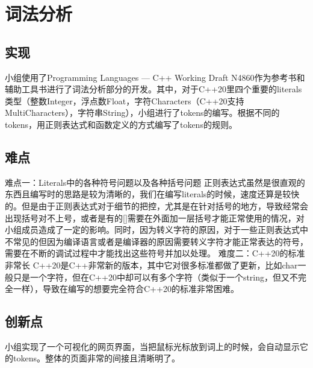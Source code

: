 \section{词法分析}

\subsection{实现}

小组使用了Programming Languages — C++ Working Draft N4860作为参考书和辅助工具书进行了词法分析部分的开发。其中，对于C++20里四个重要的literals类型（整数Integer，浮点数Float，字符Characters（C++20支持MultiCharacters），字符串String），小组进行了tokens的编写。根据不同的tokens，用正则表达式和函数定义的方式编写了tokens的规则。

\subsection{难点}

难点一：Literals中的各种符号问题以及各种括号问题
正则表达式虽然是很直观的东西且编写时的思路是较为清晰的，我们在编写literals的时候，速度还算是较快的。但是由于正则表达式对于细节的把控，尤其是在针对括号的地方，导致经常会出现括号对不上号，或者是有的[]需要在外面加一层括号才能正常使用的情况，对小组成员造成了一定的影响。同时，因为转义字符的原因，对于一些正则表达式中不常见的但因为编译语言或者是编译器的原因需要转义字符才能正常表达的符号，需要在不断的调试过程中才能找出这些符号并加以处理。
	难度二：C++20的标准非常长
C++20是C++非常新的版本，其中它对很多标准都做了更新，比如char一般只是一个字符，但在C++20中却可以有多个字符（类似于一个string，但又不完全一样），导致在编写的想要完全符合C++20的标准非常困难。

\subsection{创新点}

小组实现了一个可视化的网页界面，当把鼠标光标放到词上的时候，会自动显示它的tokens。整体的页面非常的间接且清晰明了。